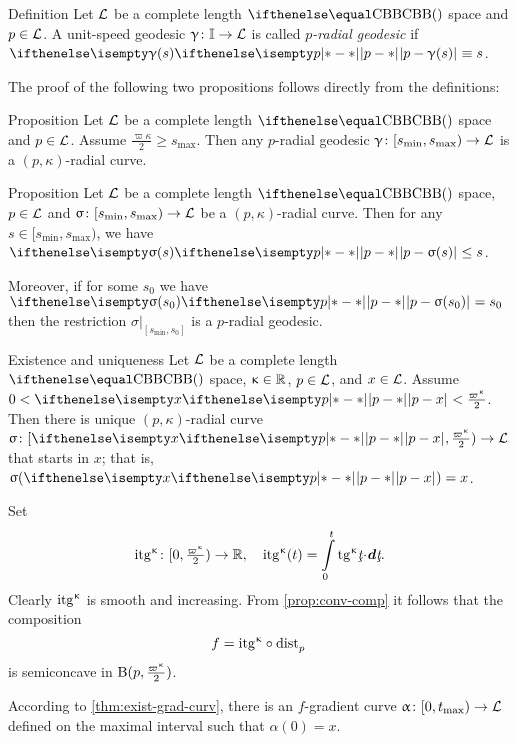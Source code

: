 \begin{thm}{Definition}\label{def:rad-geod}
Let $\mathcal{L}$ be a complete length $\Alex{}$ space
and $p\in\spc{L}$.
A unit-speed geodesic  $\gamma\:\II\to \spc{L}$  is called 
\emph{$p$-radial geodesic} if 
$\dist{p}{\gamma(s)}{}\equiv s$.
\end{thm}

The proof of the following two propositions follows directly from the definitions: 

\begin{thm}{Proposition}\label{prop:rad-geod}
Let $\mathcal{L}$ be a complete length $\Alex{}$ space
and $p\in\spc{L}$.
Assume $\tfrac{\varpi\kappa}{2}
\ge 
s_{\max}$.
Then any $p$-radial geodesic 
$\gamma\:[s_{\min},s_{\max})
\to 
\spc{L}$ 
is a $(p,\kappa)$-radial curve.
\end{thm}

\begin{thm}{Proposition}\label{prop:dist<s}
Let $\mathcal{L}$ be a complete length $\Alex{}$ space, 
$p\in\spc{L}$ 
and $\sigma\:[s_{\min},s_{\max})\to \spc{L}$ be a $(p,\kappa)$-radial curve.
Then for any $s\in [s_{\min},s_{\max})$, 
we have $\dist{p}{\sigma(s)}{}\le s$.

Moreover, 
if for some $s_0$ we have $\dist{p}{\sigma(s_0)}{}= s_0$ 
then the restriction $\sigma|_{[s_{\min},s_0]}$ is a $p$-radial geodesic.
\end{thm}

\begin{thm}{Existence and uniqueness}\label{rad-curv-exist}
Let $\mathcal{L}$ be a complete length $\Alex{}$ space, 
$\kappa\in\RR$, 
$p\in\spc{L}$, 
and $x\in \spc{L}$.
Assume
$0
<
\dist{p}{x}{}
<
\tfrac{\varpi\kappa}2$.
Then there is unique $(p,\kappa)$-radial curve $\sigma\:[\dist{p}{x}{},\tfrac{\varpi\kappa}2)\to \spc{L}$ 
that starts in $x$;
that is, $\sigma(\dist{p}{x}{})=x$.
\end{thm}


Set\index{$\itg\kappa$} 
\[\itg\kappa\:[0,\tfrac{\varpi\kappa}2)\to\RR,
\quad 
\itg\kappa (t)=\int\limits_0^t\tg\kappa\under t\cdot\dd\under t.\]
Clearly $\itg\kappa$ is smooth and increasing.
From \ref{prop:conv-comp} it follows that the composition 
\[f=\itg\kappa\circ\distfun{p}{}{}\] 
is semiconcave in $\oBall(p,\tfrac{\varpi\kappa}2)$.

According to \ref{thm:exist-grad-curv}, there is an $f$-gradient curve $\alpha\:[0,t_{\max})\to \spc{L}$ defined on the maximal interval such that $\alpha(0)=x$.

